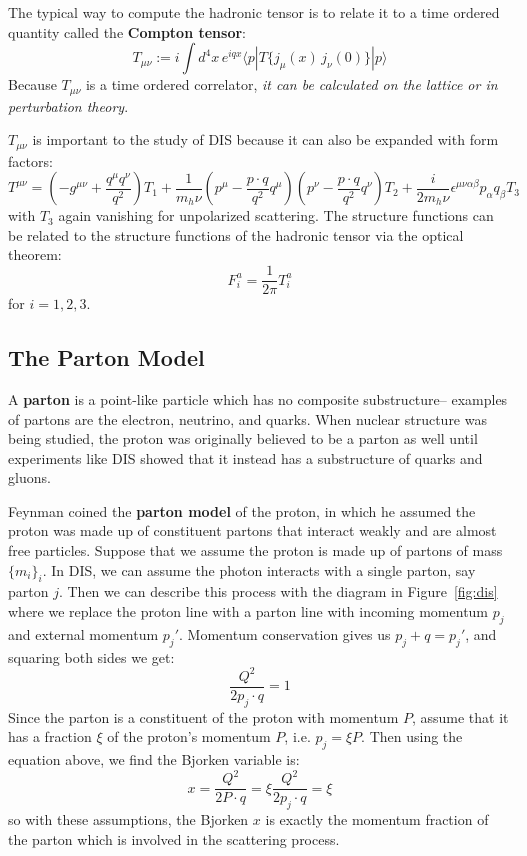 \documentclass[11pt, oneside]{article}   	%
\theoremstyle{definition}
\begin{document}
The typical way to compute the hadronic tensor is to relate it to a time ordered 
quantity called the \textbf{Compton tensor}:
\begin{equation}
	T_{\mu\nu} := i\int d^4 x\, e^{iqx}\langle p | T\{j_{\mu}(x)\, j_{\nu}(0)\} | p\rangle
\end{equation}
Because $T_{\mu\nu}$ is a time ordered correlator, \textit{it can be calculated on the lattice or in perturbation theory}. 

$T_{\mu\nu}$ is important to the study of DIS because it can also be expanded with form factors:
\begin{equation}
	T^{\mu\nu} = \left(-g^{\mu\nu} + \frac{q^\mu q^\nu}{q^2}\right) T_1 + \frac{1}{m_h\nu}\left(p^\mu - 
	\frac{p\cdot q}{q^2}q^\mu\right)\left(p^\nu - \frac{p\cdot q}{q^2}q^\nu\right) T_2 + \frac{i}{2m_h\nu} 
	\epsilon^{\mu\nu\alpha\beta}p_\alpha q_\beta T_3
\end{equation}
with $T_3$ again vanishing for unpolarized scattering. The structure functions can be related to the structure functions of the hadronic tensor via the optical theorem:
\begin{equation}
	F_i^a = \frac{1}{2\pi} T_i^a
\end{equation}
for $i = 1, 2, 3$. 

\subsection{The Parton Model}

A \textbf{parton} is a point-like particle which has no composite substructure-- examples of partons are the electron, neutrino, 
and quarks. When nuclear structure was being studied, the proton was originally believed to be a parton as well until 
experiments like DIS showed that it instead has a substructure of quarks and gluons. 

Feynman coined the \textbf{parton model} of the proton, in which he assumed the proton was made up of constituent 
partons that interact weakly and are almost free particles. Suppose that we assume the proton is made up of partons of mass 
$\{m_i\}_{i}$. In DIS, we can assume the photon interacts with a single parton, say parton $j$. Then we can describe this 
process with the diagram in Figure~\ref{fig:dis} where we replace the proton line with a parton line with incoming momentum 
$p_j$ and external momentum $p_j'$. Momentum conservation gives us $p_j + q = p_j'$, and squaring both sides we get:
\begin{equation}
	\frac{Q^2}{2p_j\cdot q} = 1
\end{equation}
Since the parton is a constituent of the proton with momentum $P$, assume that it has a fraction $\xi$ of the proton's 
momentum $P$, i.e. $p_j = \xi P$. Then using the equation above, we find the Bjorken variable is:
\begin{equation}
	x = \frac{Q^2}{2P\cdot q} = \xi \frac{Q^2}{2p_j\cdot q} = \xi
\end{equation}
so with these assumptions, the Bjorken $x$ is exactly the momentum fraction of the parton which is involved in the scattering 
process. 
\end{document}
